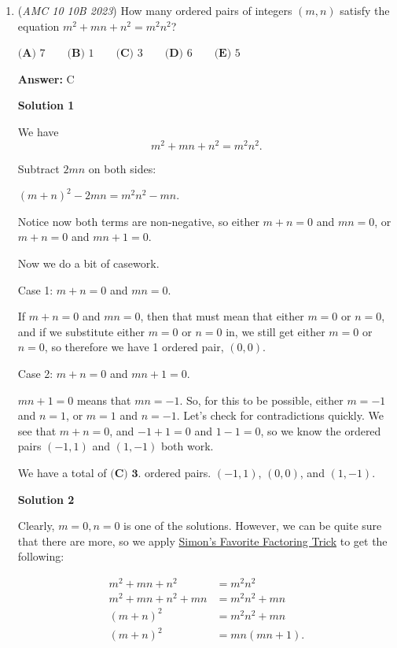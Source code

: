\begin{enumerate}
 


	\item (\textit{AMC 10 10B 2023}) How many ordered pairs of integers $(m,n)$ satisfy the equation $m^2+mn+n^2 = m^2n^2$?


 $\textbf{(A) }7\qquad\textbf{(B) }1\qquad\textbf{(C) }3\qquad\textbf{(D) }6\qquad\textbf{(E) }5$

 \textbf{Answer: }C



\textbf{Solution 1}

We have
 \[m^2 + mn + n^2 = m^2n^2.\]

 
Subtract $2mn$ on both sides: 

 \( (m+n)^2 - 2mn = m^2n^2 - mn \). 

 


 Notice now both terms are non-negative, so either \( m+n = 0 \) and \( mn = 0 \), or \( m +n = 0 \) and \( mn+1 = 0 \). 

 Now we do a bit of casework.

 
Case 1: \( m+n = 0 \) and \( mn = 0 \). 

 If \( m+n = 0 \) and \( mn = 0 \), then that must mean that either \( m = 0 \) or \( n = 0 \), and if we substitute either \( m=0 \) or \( n=0 \) in, we still get either \( m=0 \) or \( n=0 \), so therefore we have 1 ordered pair, \( (0,0) \).

 Case 2: \( m +n = 0 \) and \( mn+1 = 0 \). 

 \( mn+1 =0 \) means that \( mn=-1 \). So, for this to be possible, either \( m = -1 \) and \( n=1 \), or \( m=1 \) and \( n=-1 \). Let's check for contradictions quickly. We see that \( m + n = 0 \), and \( -1 + 1 = 0 \) and \( 1 - 1 =0 \), so we know the ordered pairs \( (-1,1) \) and \( (1,-1) \) both work.

 We have a total of $\boxed{\textbf{(C) 3}}.$ ordered pairs. \( (-1,1) \), \( (0,0) \), and \( (1,-1) \).

 



\textbf{Solution 2}

Clearly, $m=0,n=0$ is one of the solutions. However, we can be quite sure that there are more, so we apply \href{https://artofproblemsolving.com/wiki/index.php/Simon\%27s\_Favorite\_Factoring\_Trick}{Simon's Favorite Factoring Trick} to get the following: 

 
 \begin{align*} m^2+mn+n^2 &= m^2n^2\\ m^2+mn+n^2 +mn &= m^2n^2 +mn\\ (m+n)^2 &= m^2n^2 +mn\\ (m+n)^2 &= mn(mn+1).\\ \end{align*}



\end{enumerate}
